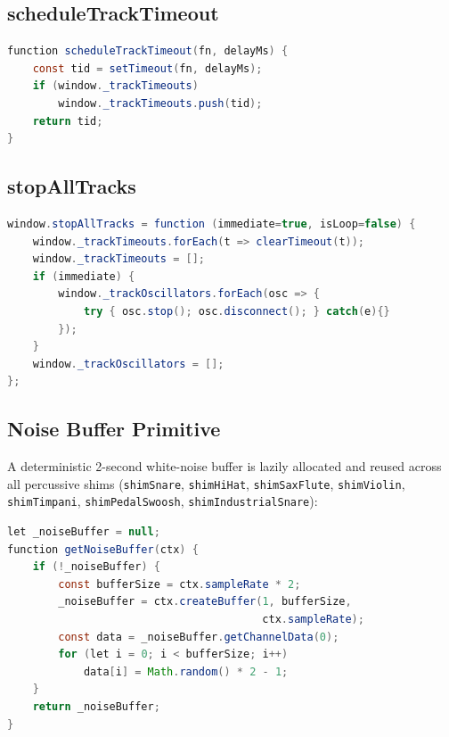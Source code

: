 \documentclass[10pt,journal,compsoc,twocolumn]{article}
\begin{document}
\subsection{scheduleTrackTimeout}

\begin{lstlisting}[language=Java,
    caption={\texttt{scheduleTrackTimeout} — cancellable timeout (line 3194).}]
function scheduleTrackTimeout(fn, delayMs) {
    const tid = setTimeout(fn, delayMs);
    if (window._trackTimeouts)
        window._trackTimeouts.push(tid);
    return tid;
}
\end{lstlisting}

\subsection{stopAllTracks}

\begin{lstlisting}[language=Java,
    caption={\texttt{stopAllTracks} — deterministic graph teardown (line 3202).}]
window.stopAllTracks = function (immediate=true, isLoop=false) {
    window._trackTimeouts.forEach(t => clearTimeout(t));
    window._trackTimeouts = [];
    if (immediate) {
        window._trackOscillators.forEach(osc => {
            try { osc.stop(); osc.disconnect(); } catch(e){}
        });
    }
    window._trackOscillators = [];
};
\end{lstlisting}

\subsection{Noise Buffer Primitive}

A deterministic 2-second white-noise buffer is lazily allocated and reused
across all percussive shims (\texttt{shimSnare}, \texttt{shimHiHat},
\texttt{shimSaxFlute}, \texttt{shimViolin}, \texttt{shimTimpani},
\texttt{shimPedalSwoosh}, \texttt{shimIndustrialSnare}):

\begin{lstlisting}[language=Java,
    caption={\texttt{getNoiseBuffer} — single shared noise buffer (line 3508).}]
let _noiseBuffer = null;
function getNoiseBuffer(ctx) {
    if (!_noiseBuffer) {
        const bufferSize = ctx.sampleRate * 2;
        _noiseBuffer = ctx.createBuffer(1, bufferSize,
                                        ctx.sampleRate);
        const data = _noiseBuffer.getChannelData(0);
        for (let i = 0; i < bufferSize; i++)
            data[i] = Math.random() * 2 - 1;
    }
    return _noiseBuffer;
}
\end{lstlisting}
\end{document}

